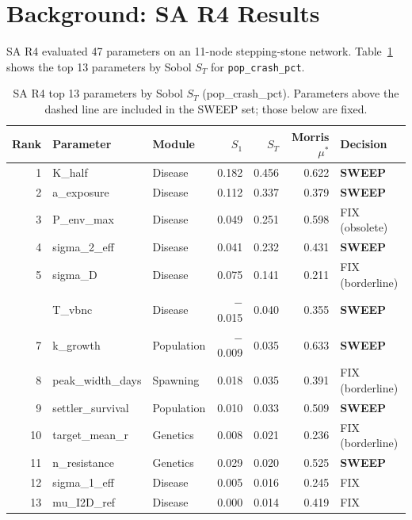 \documentclass[11pt,a4paper]{article}
\begin{document}
\section{Background: SA R4 Results}

SA R4 evaluated 47 parameters on an 11-node stepping-stone network. Table~\ref{tab:r4_top} shows the top 13 parameters by Sobol $S_T$ for \texttt{pop\_crash\_pct}.

\begin{table}[H]
\centering
\caption{SA R4 top 13 parameters by Sobol $S_T$ (pop\_crash\_pct). Parameters above the dashed line are included in the SWEEP set; those below are fixed.}
\label{tab:r4_top}
\begin{tabular}{rllrrrl}
\toprule
\textbf{Rank} & \textbf{Parameter} & \textbf{Module} & $S_1$ & $S_T$ & \textbf{Morris $\mu^*$} & \textbf{Decision} \\
\midrule
1 & K\_half & Disease & 0.182 & 0.456 & 0.622 & \textcolor{sweep}{\textbf{SWEEP}} \\
2 & a\_exposure & Disease & 0.112 & 0.337 & 0.379 & \textcolor{sweep}{\textbf{SWEEP}} \\
3 & P\_env\_max & Disease & 0.049 & 0.251 & 0.598 & \textcolor{fix}{FIX (obsolete)} \\
4 & sigma\_2\_eff & Disease & 0.041 & 0.232 & 0.431 & \textcolor{sweep}{\textbf{SWEEP}} \\
5 & sigma\_D & Disease & 0.075 & 0.141 & 0.211 & \textcolor{border}{FIX (borderline)} \\
\hdashline
6 & T\_vbnc & Disease & $-$0.015 & 0.040 & 0.355 & \textcolor{sweep}{\textbf{SWEEP}} \\
7 & k\_growth & Population & $-$0.009 & 0.035 & 0.633 & \textcolor{sweep}{\textbf{SWEEP}} \\
8 & peak\_width\_days & Spawning & 0.018 & 0.035 & 0.391 & \textcolor{border}{FIX (borderline)} \\
9 & settler\_survival & Population & 0.010 & 0.033 & 0.509 & \textcolor{sweep}{\textbf{SWEEP}} \\
10 & target\_mean\_r & Genetics & 0.008 & 0.021 & 0.236 & \textcolor{border}{FIX (borderline)} \\
11 & n\_resistance & Genetics & 0.029 & 0.020 & 0.525 & \textcolor{sweep}{\textbf{SWEEP}} \\
12 & sigma\_1\_eff & Disease & 0.005 & 0.016 & 0.245 & \textcolor{fix}{FIX} \\
13 & mu\_I2D\_ref & Disease & 0.000 & 0.014 & 0.419 & \textcolor{fix}{FIX} \\
\bottomrule
\end{tabular}
\end{table}
\end{document}
